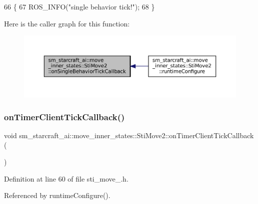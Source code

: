 \begin{DoxyCode}
66   \{
67     ROS\_INFO(\textcolor{stringliteral}{"single behavior tick!"});
68   \}
\end{DoxyCode}
Here is the caller graph for this function\+:
\nopagebreak
\begin{figure}[H]
\begin{center}
\leavevmode
\includegraphics[width=350pt]{structsm__starcraft__ai_1_1move__inner__states_1_1StiMove2_adaca8083c53db1b32438d1df4575d3f7_icgraph}
\end{center}
\end{figure}
\mbox{\label{structsm__starcraft__ai_1_1move__inner__states_1_1StiMove2_a1a2c7056ff3fe7a55f1d9a08a29b374f}} 
\subsubsection{\texorpdfstring{on\+Timer\+Client\+Tick\+Callback()}{onTimerClientTickCallback()}}
{\footnotesize\ttfamily void sm\+\_\+starcraft\+\_\+ai\+::move\+\_\+inner\+\_\+states\+::\+Sti\+Move2\+::on\+Timer\+Client\+Tick\+Callback (\begin{DoxyParamCaption}{ }\end{DoxyParamCaption})\hspace{0.3cm}{\ttfamily [inline]}}



Definition at line 60 of file sti\+\_\+move\+\_.\+h.



Referenced by runtime\+Configure().


